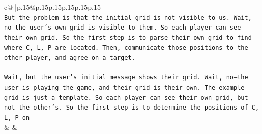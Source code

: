 \documentclass{article}
\begin{document}
{\begin{supertabular}{c@{$\;$}|p{.15\linewidth}@{}p{.15\linewidth}p{.15\linewidth}p{.15\linewidth}p{.15\linewidth}p{.15\linewidth}}
{{{\\ 
\texttt{But the problem is that the initial grid is not visible to us. Wait, no—the user's own grid is visible to them. So each player can see their own grid. So the first step is to parse their own grid to find where C, L, P are located. Then, communicate those positions to the other player, and agree on a target.} \\
\\ 
\texttt{Wait, but the user's initial message shows their grid. Wait, no—the user is playing the game, and their grid is their own. The example grid is just a template. So each player can see their own grid, but not the other's. So the first step is to determine the positions of C, L, P on} \\
            }
        }
    }
    & & \\ \\


\end{supertabular}}
\end{document}
